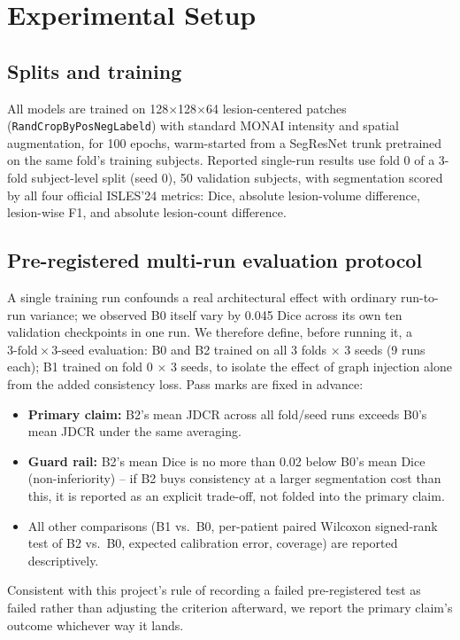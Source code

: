 \documentclass[conference]{IEEEtran}
\begin{document}
\section{Experimental Setup}

\subsection{Splits and training}
All models are trained on 128$\times$128$\times$64 lesion-centered patches (\texttt{RandCropByPosNegLabeld}) with standard MONAI intensity and spatial augmentation, for 100 epochs, warm-started from a SegResNet trunk pretrained on the same fold's training subjects. Reported single-run results use fold 0 of a 3-fold subject-level split (seed 0), 50 validation subjects, with segmentation scored by all four official ISLES'24 metrics: Dice, absolute lesion-volume difference, lesion-wise F1, and absolute lesion-count difference.

\subsection{Pre-registered multi-run evaluation protocol}
\label{sec:phase8}
A single training run confounds a real architectural effect with ordinary run-to-run variance; we observed B0 itself vary by 0.045 Dice across its own ten validation checkpoints in one run. We therefore define, before running it, a $3\text{-fold} \times 3\text{-seed}$ evaluation: B0 and B2 trained on all 3 folds $\times$ 3 seeds (9 runs each); B1 trained on fold 0 $\times$ 3 seeds, to isolate the effect of graph injection alone from the added consistency loss. Pass marks are fixed in advance:
\begin{itemize}
\item \textbf{Primary claim:} B2's mean JDCR across all fold/seed runs exceeds B0's mean JDCR under the same averaging.
\item \textbf{Guard rail:} B2's mean Dice is no more than 0.02 below B0's mean Dice (non-inferiority) -- if B2 buys consistency at a larger segmentation cost than this, it is reported as an explicit trade-off, not folded into the primary claim.
\item All other comparisons (B1 vs.\ B0, per-patient paired Wilcoxon signed-rank test of B2 vs.\ B0, expected calibration error, coverage) are reported descriptively.
\end{itemize}
Consistent with this project's rule of recording a failed pre-registered test as failed rather than adjusting the criterion afterward, we report the primary claim's outcome whichever way it lands.
\end{document}
